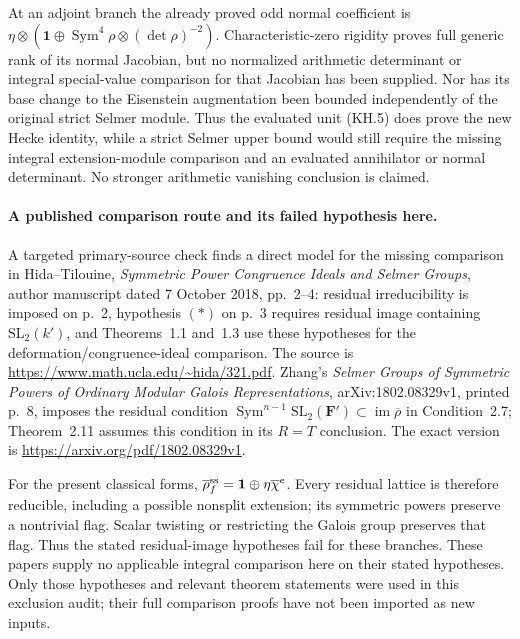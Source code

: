 At an adjoint branch the already proved odd normal coefficient
is $\eta\otimes(\mathbf1\oplus\operatorname{Sym}^4\rho
\otimes(\det\rho)^{-2})$.  Characteristic-zero rigidity proves
full generic rank of its normal Jacobian, but no normalized
arithmetic determinant or integral special-value comparison for
that Jacobian has been supplied.  Nor has its base change to the
Eisenstein augmentation been bounded independently of the
original strict Selmer module.  Thus the evaluated unit (KH.5)
does prove the new Hecke identity, while a strict Selmer upper
bound would still require the missing integral extension-module
comparison and an evaluated annihilator or normal determinant.
No stronger arithmetic vanishing conclusion is claimed.

\paragraph{A published comparison route and its failed hypothesis here.}
A targeted primary-source check finds a direct model for the
missing comparison in Hida--Tilouine, \emph{Symmetric Power
Congruence Ideals and Selmer Groups}, author manuscript dated
7 October 2018, pp.~2--4: residual irreducibility is imposed
on p.~2, hypothesis $(*)$ on p.~3 requires residual image
containing $\mathrm{SL}_2(k')$, and Theorems~1.1 and~1.3 use
these hypotheses for the deformation/congruence-ideal comparison.
The source is \url{https://www.math.ucla.edu/~hida/321.pdf}.
Zhang's \emph{Selmer Groups of Symmetric Powers of Ordinary
Modular Galois Representations}, arXiv:1802.08329v1, printed
p.~8, imposes the residual condition
$\operatorname{Sym}^{n-1}\mathrm{SL}_2(\mathbf F')
\subset\operatorname{im}\overline\rho$ in Condition~2.7;
Theorem~2.11 assumes this condition in its $R=T$ conclusion.
The exact version is
\url{https://arxiv.org/pdf/1802.08329v1}.

For the present classical forms,
$\overline\rho_f^{\rm ss}=\mathbf1\oplus\eta\overline\chi^e$.
Every residual lattice is therefore reducible, including a
possible nonsplit extension; its symmetric powers preserve
a nontrivial flag.  Scalar twisting or restricting the Galois
group preserves that flag.  Thus the stated residual-image
hypotheses fail for these branches.  These papers supply no
applicable integral comparison here on their stated hypotheses.
Only those hypotheses and relevant theorem statements were
used in this exclusion audit; their full comparison proofs
have not been imported as new inputs.
